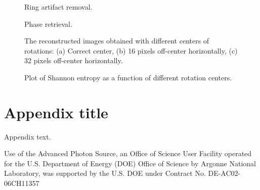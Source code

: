 \documentclass[pdf]{iucr}              %
\begin{document}
\onecolumn
\begin{figure}
\centering
\caption{Ring artifact removal.}
\label{fig:ProcessRing}
\end{figure}
\twocolumn

\onecolumn
\begin{figure}
\centering
\caption{Phase retrieval.}
\label{fig:ProcessPhase}
\end{figure}
\twocolumn

\begin{figure}
\centering
\caption{The reconstructed images obtained with different centers of rotations: (a) Correct center, (b) 16 pixels  off-center horizontally, (c) 32 pixels off-center horizontally.}
\label{fig:OptimizeCenter1}
\end{figure}

\begin{figure}
\centering
\caption{Plot of Shannon entropy as a function of different rotation centers.}
\label{fig:OptimizeCenter2}
\end{figure}


\appendix
\section{Appendix title}

Appendix text.



Use of the Advanced Photon Source, an Office of Science User Facility operated for the U.S. Department of Energy (DOE) Office of Science by Argonne National Laboratory, was supported by the U.S. DOE under Contract No. DE-AC02-06CH11357





 
\end{document}
